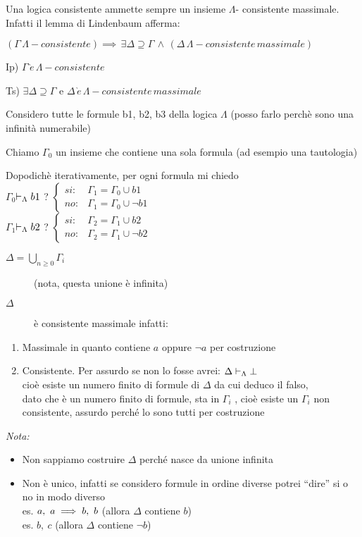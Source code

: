 Una logica consistente ammette sempre un insieme $\Lambda$- consistente
massimale. Infatti il lemma di Lindenbaum afferma:

$(\Gamma\,\Lambda-consistente)\implies\,\exists\Delta\supseteq\Gamma\,\wedge\,(\Delta\,\Lambda-consistente\, massimale)$

Ip) $\Gamma\,\grave{e}\,\Lambda-consistente$

Ts) $\exists\Delta\supseteq\Gamma$ e $\Delta\,\grave{e}\,\Lambda-consistente\, massimale$

Considero tutte le formule b1, b2, b3 della logica $\Lambda$ (posso
farlo perchè sono una infinità numerabile)

Chiamo $\Gamma_{0}$ un insieme che contiene una sola formula (ad
esempio una tautologia)

Dopodichè iterativamente, per ogni formula mi chiedo\\


$\Gamma_{0}$$\vdash_{\Lambda}b1$ ? $\begin{cases}
si: & \Gamma_{1}=\Gamma_{0}\cup b1\\
no: & \Gamma_{1}=\Gamma_{0}\cup\neg b1
\end{cases}$\\


$\Gamma_{1}$$\vdash_{\Lambda}b2$ ? $\begin{cases}
si: & \Gamma_{2}=\Gamma_{1}\cup b2\\
no: & \Gamma_{2}=\Gamma_{1}\cup\neg b2
\end{cases}$ 
\begin{description}
\item [{$\Delta=\bigcup_{n\geq0}\Gamma_{i}$}] (nota, questa unione è infinita) 
\item [{$\Delta$}] è consistente massimale infatti:\end{description}
\begin{enumerate}
\item Massimale in quanto contiene $a$ oppure $\neg a$ per costruzione 
\item Consistente. Per assurdo se non lo fosse avrei: $\Delta\vdash_{\Lambda}\bot$\\
 cioè esiste un numero finito di formule di $\Delta$ da cui deduco
il falso,\\
 dato che è un numero finito di formule, sta in $\Gamma_{i}$ , cioè
esiste un $\Gamma_{i}$ non consistente, assurdo perché lo sono tutti
per costruzione \lightning 
\end{enumerate}
\emph{\large{Nota:}}{\large \par}
\begin{itemize}
\item Non sappiamo costruire $\Delta$ perché nasce da unione infinita 
\item Non è unico, infatti se considero formule in ordine diverse potrei
``dire'' si o no in modo diverso \\
 es. $a,\ a\implies b,\ b$ (allora $\Delta$ contiene $b$)\\
 es. $b,\ c$ (allora $\Delta$ contiene $\neg b$) 
\end{itemize}

